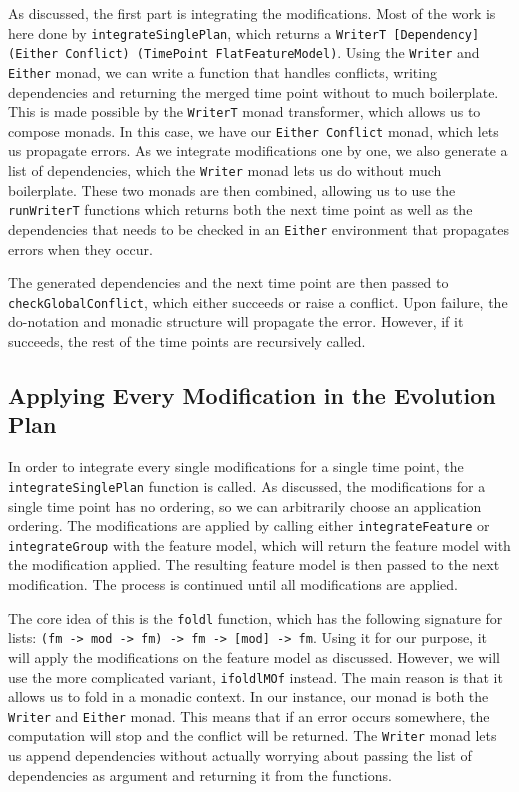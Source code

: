 \documentclass[a4paper,english]{ifimaster}
\begin{document}
As discussed, the first part is integrating the modifications. Most of the work is here done by \texttt{integrate\-Single\-Plan}, which returns a \texttt{WriterT [Dependency] (Either Conflict) (TimePoint FlatFeatureModel)}. Using the \texttt{Writer} and \texttt{Either} monad, we can write a function that handles conflicts, writing dependencies and returning the merged time point without to much boilerplate. This is made possible by the \texttt{WriterT} monad transformer, which allows us to compose monads. In this case, we have our \texttt{Either Conflict} monad, which lets us propagate errors. As we integrate modifications one by one, we also generate a list of dependencies, which the \texttt{Writer} monad lets us do without much boilerplate. These two monads are then combined, allowing us to use the \texttt{runWriterT} functions which returns both the next time point as well as the dependencies that needs to be checked in an \texttt{Either} environment that propagates errors when they occur.

The generated dependencies and the next time point are then passed to \texttt{check\-Global\-Conflict}, which either succeeds or raise a conflict. Upon failure, the do-notation and monadic structure will propagate the error. However, if it succeeds, the rest of the time points are recursively called.

\subsection{Applying Every Modification in the Evolution Plan}%
\label{sub:applying_modifications}

In order to integrate every single modifications for a single time point, the \texttt{integrate\-Single\-Plan} function is called. As discussed, the modifications for a single time point has no ordering, so we can arbitrarily choose an application ordering. The modifications are applied by calling either \texttt{integrate\-Feature} or \texttt{integrate\-Group} with the feature model, which will return the feature model with the modification applied. The resulting feature model is then passed to the next modification. The process is continued until all modifications are applied.

The core idea of this is the \texttt{foldl} function, which has the following signature for lists: \texttt{(fm -> mod -> fm) -> fm -> [mod] -> fm}. Using it for our purpose, it will apply the modifications on the feature model as discussed. However, we will use the more complicated variant, \texttt{ifoldlMOf} instead. The main reason is that it allows us to fold in a monadic context. In our instance, our monad is both the \texttt{Writer} and \texttt{Either} monad. This means that if an error occurs somewhere, the computation will stop and the conflict will be returned. The \texttt{Writer} monad lets us append dependencies without actually worrying about passing the list of dependencies as argument and returning it from the functions.
\end{document}
